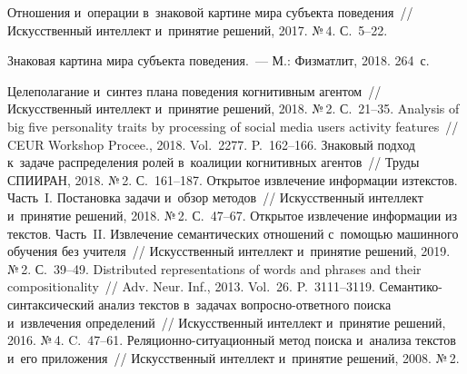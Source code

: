 \begin{multicols}{2}
 {\small\frenchspacing
 {%
 \begin{thebibliography}{99}
 
   Отношения и~операции в~знаковой картине 
мира субъекта поведения~// Искусственный интеллект и~принятие решений, 
2017. №\,4. С.~5--22.

   Знаковая 
картина мира субъекта поведения.~--- М.: Физматлит, 2018. 264~с.

   Целеполагание и~синтез плана поведения когнитивным 
агентом~// Искусственный интеллект и~принятие решений, 2018. №\,2.  
С.~21--35.
Analysis of big five personality traits by processing of social media users activity 
features~// CEUR Workshop Procee., 2018.  
Vol.~2277. P.~162--166.
   Знаковый подход к~задаче распределения 
ролей в~коалиции когнитивных агентов~// Труды СПИИРАН, 2018. №\,2. 
С.~161--187.
Открытое извлечение информации из\linebreak текс\-тов. Часть~I. Постановка задачи 
и~обзор методов~// Искусственный интеллект и~принятие решений, 2018. №\,2. 
С.~47--67.
Открытое извлечение информации из текстов. Часть~II. Извлечение 
семантических отношений с~помощью машинного обучения без учителя~// 
Искусственный интеллект и~принятие решений, 2019. №\,2. С.~39--49.
   Distributed 
representations of words and phrases and their compositionality~// Adv.
Neur. Inf., 2013. Vol.~26. P.~3111--3119.
Семантико-синтаксический анализ текстов в~задачах  
воп\-рос\-но-от\-вет\-но\-го поиска и~извлечения определений~// Искусственный 
интеллект и~принятие решений, 2016. №\,4. C.~47--61.
Ре\-ля\-ци\-он\-но-си\-ту\-а\-ци\-он\-ный метод поиска и~анализа текстов и~его 
приложения~// Искусственный интеллект и~принятие решений, 2008. №\,2. 

\end{thebibliography}}}
\end{multicols}
